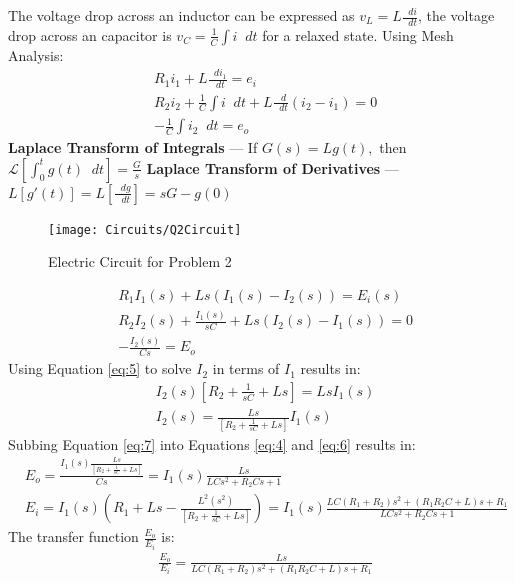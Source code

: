 \documentclass[12pt]{article}
\newenvironment{problem}[2][Problem]{\begin{trivlist}
		\item[\hskip \labelsep {\bfseries #1}\hskip \labelsep {\bfseries #2.}]}{\end{trivlist}}
\newcommand\diff{\mathop{}\!d}
\begin{document}
\begin{problem}{2 --- B-3-7 --- obtain transfer function } \hfill \break
The voltage drop across an inductor can be expressed as $v_L = L \frac{\diff i}{\diff t}$, the voltage drop across an capacitor is $v_C =\frac{1}{C} \int i \diff t$ for a relaxed state. Using Mesh Analysis: 
\begin{align}
& R_1i_1+ L  \frac{\diff i_1}{\diff t} = e_i \\
& R_2i_2+\frac{1}{C}\int i \diff t + L \frac{\diff}{\diff t}(i_2-i_1) = 0 \\
& -\frac{1}{C} \int i_2 \diff t = e_o 
\end{align}
\textbf{Laplace Transform of Integrals} ---
If $ G(s)=L{g(t)}, $ then $\mathscr{L}\left[ \int_0^t g(t) \diff t \right] = \displaystyle \frac{G}{s} $ \newline
\textbf{Laplace Transform of Derivatives} ---
$\displaystyle L[g'(t)]=L\left[\frac{\diff g}{\diff t} 
	​	\right ] =sG-g(0)$
\begin{figure}
	\centering
	\texttt{[image: Circuits/Q2Circuit]}
	\caption{Electric Circuit for Problem 2}
	\label{fig:q2circuit}
\end{figure}
\begin{align}
& R_1I_1(s) + Ls(I_1(s)-I_2(s))=E_i(s) \label{eq:4} \\
& R_2I_2(s)+\frac{I_1(s)}{sC}+Ls(I_2(s)-I_1(s))=0 \label{eq:5} \\
& -\frac{I_2(s)}{Cs}=E_o	\label{eq:6}
\end{align}
Using Equation \ref{eq:5} to solve $I_2$ in terms of $I_1$ results in:
\begin{align}
&I_2(s) \left[R_2+\frac{1}{sC}+Ls\right]=Ls I_1(s) \label{eq:7} \\
&I_2(s) =\frac{Ls}{\left[R_2+\frac{1}{sC}+Ls\right]} I_1(s) \nonumber 
\end{align} 
Subbing Equation \ref{eq:7} into Equations \ref{eq:4} and \ref{eq:6} results in:
\begin{align*}
& E_o = \frac{I_1(s) \frac{Ls}{\left[R_2+\frac{1}{sC}+Ls\right]}}{Cs} = I_1(s)\frac{Ls}{LCs^2+R_2Cs+1} \\
& E_i = I_1(s)\left(R_1+Ls-\frac{L^2(s^2)}{\left[R_2+\frac{1}{sC}+Ls\right]}\right) = I_1(s)\frac{LC(R_1+R_2)s^2+(R_1R_2C+L)s+R_1}{LCs^2+R_2Cs+1}
\end{align*}
The transfer function $\displaystyle \frac{E_o}{E_i}$ is:
\begin{align*}
&\boxed{\frac{E_o}{E_i}=\frac{Ls}{LC(R_1+R_2)s^2+(R_1R_2C+L)s+R_1}}
\end{align*}
\end{problem}
\end{document}
